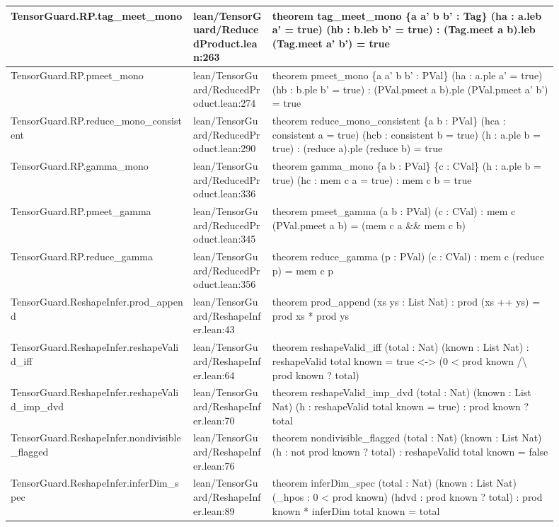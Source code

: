 \documentclass[10pt]{article}
\begin{document}
\begin{longtable}{|p{0.30\linewidth}|p{0.13\linewidth}|p{0.47\linewidth}|}
\hline
TensorGuard.RP.tag\_meet\_mono & lean/TensorGuard/ReducedProduct.lean:263 & theorem tag\_meet\_mono \{a a' b b' : Tag\} (ha : a.leb a' = true) (hb : b.leb b' = true) : (Tag.meet a b).leb (Tag.meet a' b') = true \\
\hline
TensorGuard.RP.pmeet\_mono & lean/TensorGuard/ReducedProduct.lean:274 & theorem pmeet\_mono \{a a' b b' : PVal\} (ha : a.ple a' = true) (hb : b.ple b' = true) : (PVal.pmeet a b).ple (PVal.pmeet a' b') = true \\
\hline
TensorGuard.RP.reduce\_mono\_consistent & lean/TensorGuard/ReducedProduct.lean:290 & theorem reduce\_mono\_consistent \{a b : PVal\} (hca : consistent a = true) (hcb : consistent b = true) (h : a.ple b = true) : (reduce a).ple (reduce b) = true \\
\hline
TensorGuard.RP.gamma\_mono & lean/TensorGuard/ReducedProduct.lean:336 & theorem gamma\_mono \{a b : PVal\} \{c : CVal\} (h : a.ple b = true) (hc : mem c a = true) : mem c b = true \\
\hline
TensorGuard.RP.pmeet\_gamma & lean/TensorGuard/ReducedProduct.lean:345 & theorem pmeet\_gamma (a b : PVal) (c : CVal) : mem c (PVal.pmeet a b) = (mem c a \&\& mem c b) \\
\hline
TensorGuard.RP.reduce\_gamma & lean/TensorGuard/ReducedProduct.lean:356 & theorem reduce\_gamma (p : PVal) (c : CVal) : mem c (reduce p) = mem c p \\
\hline
TensorGuard.ReshapeInfer.prod\_append & lean/TensorGuard/ReshapeInfer.lean:43 & theorem prod\_append (xs ys : List Nat) : prod (xs ++ ys) = prod xs * prod ys \\
\hline
TensorGuard.ReshapeInfer.reshapeValid\_iff & lean/TensorGuard/ReshapeInfer.lean:64 & theorem reshapeValid\_iff (total : Nat) (known : List Nat) : reshapeValid total known = true <-> (0 < prod known /\textbackslash{} prod known ? total) \\
\hline
TensorGuard.ReshapeInfer.reshapeValid\_imp\_dvd & lean/TensorGuard/ReshapeInfer.lean:70 & theorem reshapeValid\_imp\_dvd (total : Nat) (known : List Nat) (h : reshapeValid total known = true) : prod known ? total \\
\hline
TensorGuard.ReshapeInfer.nondivisible\_flagged & lean/TensorGuard/ReshapeInfer.lean:76 & theorem nondivisible\_flagged (total : Nat) (known : List Nat) (h : not  prod known ? total) : reshapeValid total known = false \\
\hline
TensorGuard.ReshapeInfer.inferDim\_spec & lean/TensorGuard/ReshapeInfer.lean:89 & theorem inferDim\_spec (total : Nat) (known : List Nat) (\_hpos : 0 < prod known) (hdvd : prod known ? total) : prod known * inferDim total known = total \\

\end{longtable}
\end{document}
